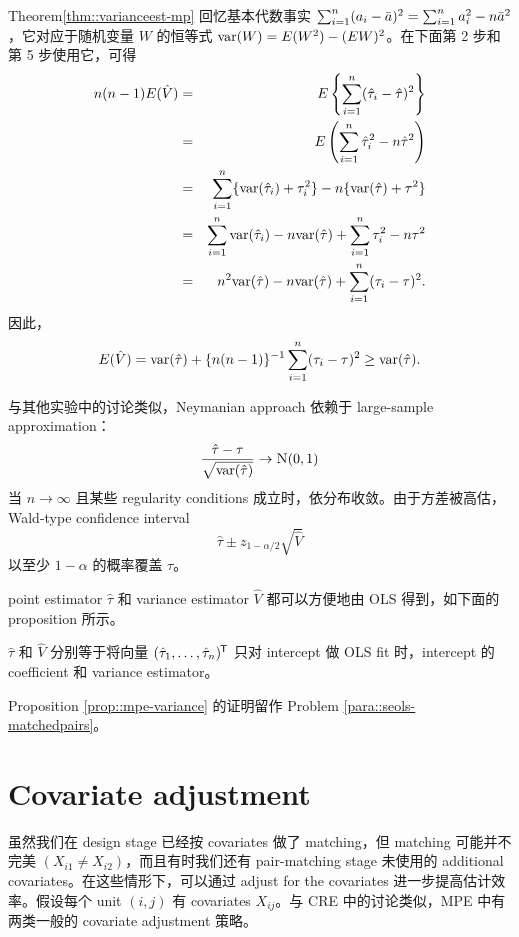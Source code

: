 \begin{myproof}{Theorem}{\ref{thm::varianceest-mp}}
回忆基本代数事实 $\sum_{i=1}^n (a_i - \bar a)^2 = \sum_{i=1}^n a_i^2 - n \bar{a}^2$，它对应于随机变量 $W$ 的恒等式 $\textup{var}(W) = E(W^2) - (EW)^2$。在下面第 2 步和第 5 步使用它，可得
\begin{eqnarray*}
n(n-1) E( \hat{V} ) &=& E\left\{   \sum_{i=1}^n (\hat{\tau}_i - \hat{\tau})^2 \right\}  \\
&=&  E\left (    \sum_{i=1}^n \hat{\tau}_i^2 - n \hat{\tau}^2  \right)   \\
&=& \sum_{i=1}^n \{  \textup{var}(\hat{\tau}_i) + \tau_i^2 \} - n \{  \textup{var}(\hat{\tau})  + \tau^2 \}\\
&=& \sum_{i=1}^n  \textup{var}(\hat{\tau}_i)  - n \textup{var}(\hat{\tau}) + \sum_{i=1}^n  \tau_i^2 - n  \tau^2 \\
&=& n^2 \textup{var}(\hat{\tau})  - n \textup{var}(\hat{\tau})  + \sum_{i=1}^n (\tau_i - \tau)^2.
\end{eqnarray*}
因此，
$$
E( \hat{V} )  = \textup{var}(\hat{\tau})  + \{ n(n-1)  \}^{-1}   \sum_{i=1}^n (\tau_i - \tau)^2 \geq  \textup{var}(\hat{\tau})  .
$$
\end{myproof}




与其他实验中的讨论类似，Neymanian approach 依赖于 large-sample approximation：
$$
\frac{  \hat\tau  -  \tau }{  \sqrt{\var( \hat\tau )} } \rightarrow \N01
$$
当 $n\rightarrow \infty$ 且某些 regularity conditions 成立时，依分布收敛。由于方差被高估，Wald-type confidence interval
$$
 \hat\tau   \pm     z_{1-\alpha/2}  \sqrt{ \hat{V} }
$$
以至少 $1-\alpha$ 的概率覆盖 $\tau$。



point estimator $\hat\tau$ 和 variance estimator $\hat{V}$ 都可以方便地由 OLS 得到，如下面的 proposition 所示。

\begin{proposition}\label{prop::mpe-variance}
$\hat\tau$ 和
$\hat{V}$ 分别等于将向量 $(\hat{\tau}_1, \ldots, \hat{\tau}_n)^{\mkern-1.5mu\mathsf{T}}$ 只对 intercept 做 OLS fit 时，intercept 的 coefficient 和 variance estimator。
\end{proposition}

Proposition \ref{prop::mpe-variance} 的证明留作 Problem \ref{para::seols-matchedpairs}。
  
  

\section{Covariate adjustment}



虽然我们在 design stage 已经按 covariates 做了 matching，但 matching 可能并不完美 $(X_{i1}\neq X_{i2})$，而且有时我们还有 pair-matching stage 未使用的 additional covariates。在这些情形下，可以通过 adjust for the covariates 进一步提高估计效率。假设每个 unit $(i, j)$ 有 covariates $X_{ij} $。与 CRE 中的讨论类似，MPE 中有两类一般的 covariate adjustment 策略。



